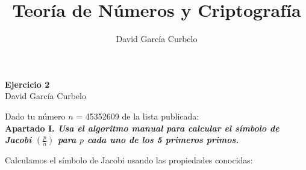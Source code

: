 \documentclass[fleqn]{article}
\author{David García Curbelo}
\title{Teoría de Números y Criptografía}
\begin{document}
    \begin{center}
        \LARGE{\textbf{Ejercicio 2}} \\
        \Large{David García Curbelo} \\
    \end{center}

    \vspace{1cm}
    
    Dado tu número $n$ = 45352609 de la lista publicada: \\ 


    \textbf{Apartado I. \textit{Usa el algoritmo manual para calcular el símbolo de Jacobi $\left(\frac{p}{n}\right)$ para $p$ 
    cada uno de los 5 primeros primos.}} 

    Calculamos el símbolo de Jacobi usando las propiedades conocidas:
\end{document}
